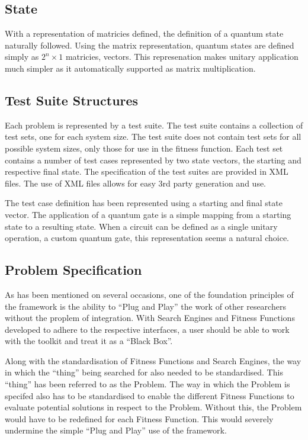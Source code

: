 \documentclass[authoryearcitations]{UoYCSproject}
\begin{document}
\subsection{State}
With a representation of matricies defined, the definition of a quantum state naturally followed.
Using the matrix representation, quantum states are defined simply as $2^n\times1$ matricies, vectors.
This represenation makes unitary application much simpler as it automatically supported as matrix multiplication.

\subsection{Test Suite Structures}
Each problem is represented by a test suite.
The test suite contains a collection of test sets, one for each system size.
The test suite does not contain test sets for all possible system sizes, only those for use in the fitness function.
Each test set contains a number of test cases represented by two state vectors, the starting and respective final state.
The specification of the test suites are provided in XML files.
The use of XML files allows for easy 3rd party generation and use.



The test case definition has been represented using a starting and final state vector.
The application of a quantum gate is a simple mapping from a starting state to a resulting state.
When a circuit can be defined as a single unitary operation, a custom quantum gate, this representation seems a natural choice.


\subsection{Problem Specification}
As has been mentioned on several occasions, one of the foundation principles of the framework is the ability to ``Plug and Play'' the work of other researchers without the proplem of integration.
With Search Engines and Fitness Functions developed to adhere to the respective interfaces, a user should be able to work with the toolkit and treat it as a ``Black Box''.

Along with the standardisation of Fitness Functions and Search Engines, the way in which the ``thing'' being searched for also needed to be standardised.
This ``thing'' has been referred to as the Problem.
The way in which the Problem is specifed also has to be standardised to enable the different Fitness Functions to evaluate potential solutions in respect to the Problem.
Without this, the Problem would have to be redefined for each Fitness Function.
This would severely undermine the simple ``Plug and Play'' use of the framework.
\end{document}
